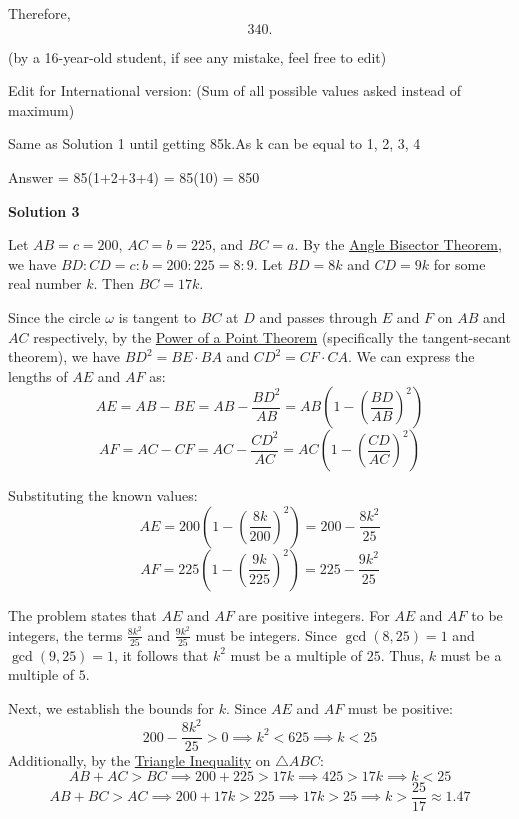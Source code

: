 \begin{enumerate}
 Therefore,
 \[\boxed{340}.\]

 (by a 16-year-old student, if see any mistake, feel free to edit)

 Edit for International version: (Sum of all possible values asked instead of maximum)

 Same as Solution 1 until getting 85k.As k can be equal to 1, 2, 3, 4

 Answer = 85(1+2+3+4) = 85(10) = 850

 



\textbf{Solution 3}

Let $AB=c=200$, $AC=b=225$, and $BC=a$. By the \href{https://artofproblemsolving.com/wiki/index.php?title=Angle\_Bisector\_Theorem}{Angle Bisector Theorem}, we have $BD:CD = c:b = 200:225 = 8:9$. Let $BD = 8k$ and $CD = 9k$ for some real number $k$. Then $BC = 17k$.

 Since the circle $\omega$ is tangent to $BC$ at $D$ and passes through $E$ and $F$ on $AB$ and $AC$ respectively, by the \href{https://artofproblemsolving.com/wiki/index.php?title=Power\_of\_a\_Point\_Theorem}{Power of a Point Theorem} (specifically the tangent-secant theorem), we have $BD^2 = BE \cdot BA$ and $CD^2 = CF \cdot CA$. We can express the lengths of $AE$ and $AF$ as:
 \[AE = AB - BE = AB - \frac{BD^2}{AB} = AB \left( 1 - \left(\frac{BD}{AB}\right)^2 \right)\]
 \[AF = AC - CF = AC - \frac{CD^2}{AC} = AC \left( 1 - \left(\frac{CD}{AC}\right)^2 \right)\]

 Substituting the known values:
 \[AE = 200 \left( 1 - \left(\frac{8k}{200}\right)^2 \right) = 200 - \frac{8k^2}{25}\]
 \[AF = 225 \left( 1 - \left(\frac{9k}{225}\right)^2 \right) = 225 - \frac{9k^2}{25}\]

 The problem states that $AE$ and $AF$ are positive integers. For $AE$ and $AF$ to be integers, the terms $\frac{8k^2}{25}$ and $\frac{9k^2}{25}$ must be integers. Since $\gcd(8, 25)=1$ and $\gcd(9, 25)=1$, it follows that $k^2$ must be a multiple of $25$. Thus, $k$ must be a multiple of $5$.

 Next, we establish the bounds for $k$. Since $AE$ and $AF$ must be positive:
 \[200 - \frac{8k^2}{25} > 0 \implies k^2 < 625 \implies k < 25\]Additionally, by the \href{https://artofproblemsolving.com/wiki/index.php?title=Triangle\_Inequality}{Triangle Inequality} on $\triangle ABC$:
 \[AB + AC > BC \implies 200 + 225 > 17k \implies 425 > 17k \implies k < 25\]
 \[AB + BC > AC \implies 200 + 17k > 225 \implies 17k > 25 \implies k > \frac{25}{17} \approx 1.47\]


\end{enumerate}

